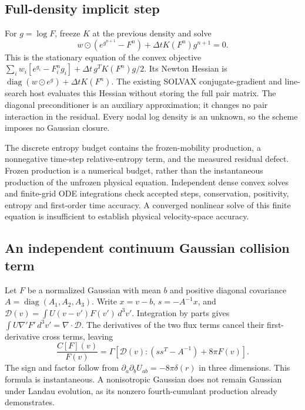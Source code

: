 \documentclass[11pt,letterpaper]{article}
\begin{document}
\subsection{Full-density implicit step}
For $g=\log F$, freeze $K$ at the previous density and solve
\begin{equation}
 w\odot(e^{g^{n+1}}-F^n)+\Delta t K(F^n)g^{n+1}=0.
\end{equation}
This is the stationary equation of the convex objective
$\sum_iw_i[e^{g_i}-F_i^ng_i]+\Delta t\,g^TK(F^n)g/2$.
Its Newton Hessian is
$\operatorname{diag}(w\odot e^g)+\Delta t K(F^n)$.
The existing SOLVAX conjugate-gradient and line-search host evaluates
this Hessian without storing the full pair matrix. The diagonal
preconditioner is an auxiliary approximation; it changes no pair
interaction in the residual. Every nodal log density is an unknown,
so the scheme imposes no Gaussian closure.

The discrete entropy budget contains the frozen-mobility production,
a nonnegative time-step relative-entropy term, and the measured residual
defect. Frozen production is a numerical budget, rather than the
instantaneous production of the unfrozen physical equation. Independent
dense convex solves and finite-grid ODE integrations check accepted
steps, conservation, positivity, entropy and first-order time accuracy.
A converged nonlinear solve of this finite equation is insufficient to
establish physical velocity-space accuracy.

\subsection{An independent continuum Gaussian collision term}
Let $F$ be a normalized Gaussian with mean $b$ and positive diagonal
covariance $A=\operatorname{diag}(A_1,A_2,A_3)$. Write $x=v-b$,
$s=-A^{-1}x$, and
$\mathcal D(v)=\int U(v-v')F(v')\,d^3v'$.
Integration by parts gives
$\int U\nabla'F'\,d^3v'=\nabla\cdot\mathcal D$.
The derivatives of the two flux terms cancel their first-derivative
cross terms, leaving
\begin{equation}
 \frac{C[F](v)}{F(v)}=\Gamma\left[
 \mathcal D(v):(ss^T-A^{-1})+8\pi F(v)\right].
 \label{eq:gaussian-strong}
\end{equation}
The sign and factor follow from
$\partial_a\partial_bU_{ab}=-8\pi\delta(r)$ in three dimensions.
This formula is instantaneous. A nonisotropic Gaussian does not remain
Gaussian under Landau evolution, as its nonzero fourth-cumulant
production already demonstrates.
\end{document}
